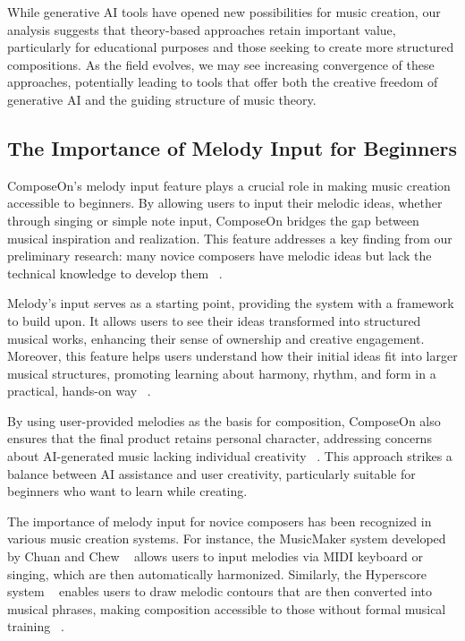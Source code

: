 While generative AI tools have opened new possibilities for music creation, our analysis suggests that theory-based approaches retain important value, particularly for educational purposes and those seeking to create more structured compositions. As the field evolves, we may see increasing convergence of these approaches, potentially leading to tools that offer both the creative freedom of generative AI and the guiding structure of music theory.

\subsection{The Importance of Melody Input for Beginners}

ComposeOn's melody input feature plays a crucial role in making music creation accessible to beginners. By allowing users to input their melodic ideas, whether through singing or simple note input, ComposeOn bridges the gap between musical inspiration and realization. This feature addresses a key finding from our preliminary research: many novice composers have melodic ideas but lack the technical knowledge to develop them ~\cite{r14,r15}.

Melody's input serves as a starting point, providing the system with a framework to build upon. It allows users to see their ideas transformed into structured musical works, enhancing their sense of ownership and creative engagement. Moreover, this feature helps users understand how their initial ideas fit into larger musical structures, promoting learning about harmony, rhythm, and form in a practical, hands-on way ~\cite{r19}.

By using user-provided melodies as the basis for composition, ComposeOn also ensures that the final product retains personal character, addressing concerns about AI-generated music lacking individual creativity ~\cite{r20}. This approach strikes a balance between AI assistance and user creativity, particularly suitable for beginners who want to learn while creating.

The importance of melody input for novice composers has been recognized in various music creation systems. For instance, the MusicMaker system developed by Chuan and Chew ~\cite{chuan2007} allows users to input melodies via MIDI keyboard or singing, which are then automatically harmonized. Similarly, the Hyperscore system ~\cite{farbood2004} enables users to draw melodic contours that are then converted into musical phrases, making composition accessible to those without formal musical training ~\cite{r18}.

